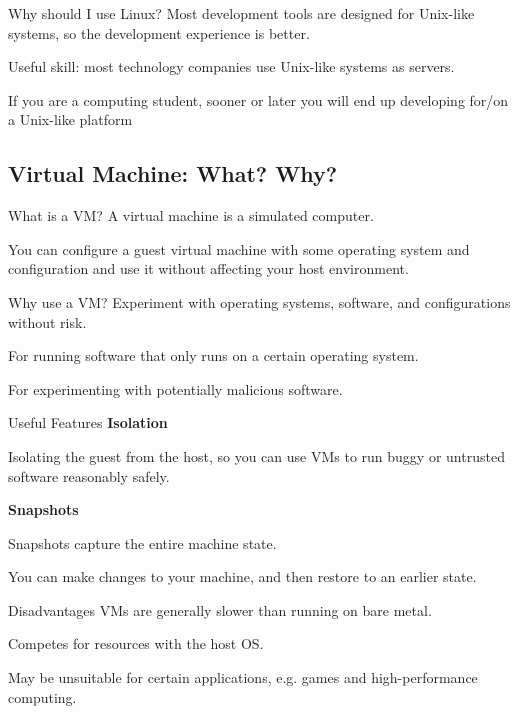 \documentclass[12pt]{beamer}
\begin{document}
\begin{frame}{Why should I use Linux?}
  Most development tools are designed for Unix-like systems, so the development experience is better.

  Useful skill: most technology companies use Unix-like systems as servers.

  If you are a computing student, sooner or later you will end up developing for/on a Unix-like platform
\end{frame}

\subsection{Virtual Machine: What? Why?}
\begin{frame}{What is a VM?}
  A virtual machine is a simulated computer.

  You can configure a guest virtual machine with some operating system and configuration and use it without affecting your host environment.
\end{frame}

\begin{frame}{Why use a VM?}
  Experiment with operating systems, software, and configurations without risk.

  For running software that only runs on a certain operating system.

  For experimenting with potentially malicious software.
\end{frame}

\begin{frame}{Useful Features}
  \textbf{Isolation}

  Isolating the guest from the host, so you can use VMs to run buggy or untrusted software reasonably safely.

  \textbf{Snapshots}

  Snapshots capture the entire machine state.

  You can make changes to your machine, and then restore to an earlier state.

\end{frame}

\begin{frame}{Disadvantages}
  VMs are generally slower than running on bare metal.

  Competes for resources with the host OS.

  May be unsuitable for certain applications, e.g. games and high-performance computing.
\end{frame}
\end{document}
